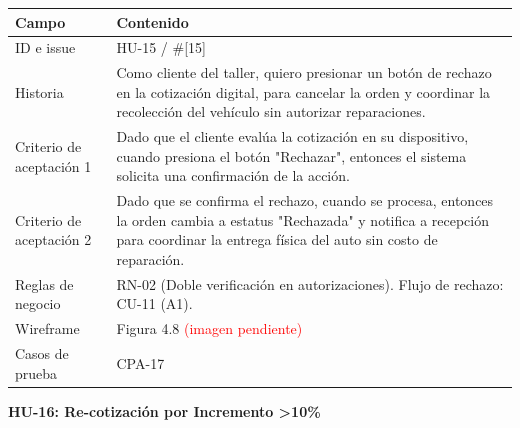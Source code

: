 {\def\LTcaptype{none} %
\begin{longtable}[]{@{}
  >{\raggedright\arraybackslash}p{}
  >{\raggedright\arraybackslash}p{}@{}}
\toprule\noalign{}
\begin{minipage}[b]{\linewidth}\raggedright
\textbf{Campo}
\end{minipage} & \begin{minipage}[b]{\linewidth}\raggedright
\textbf{Contenido}
\end{minipage} \\
\midrule\noalign{}
\endhead
\bottomrule\noalign{}
\endlastfoot
ID e issue & HU-15 / \#{[}15{]} \\
Historia & Como cliente del taller, quiero presionar un botón de rechazo
en la cotización digital, para cancelar la orden y coordinar la
recolección del vehículo sin autorizar reparaciones. \\
Criterio de aceptación 1 & Dado que el cliente evalúa la cotización en
su dispositivo, cuando presiona el botón "Rechazar", entonces el sistema
solicita una confirmación de la acción. \\
Criterio de aceptación 2 & Dado que se confirma el rechazo, cuando se
procesa, entonces la orden cambia a estatus "Rechazada" y notifica a
recepción para coordinar la entrega física del auto sin costo de
reparación. \\
Reglas de negocio & RN-02 (Doble verificación en autorizaciones). Flujo
de rechazo: CU-11 (A1). \\
Wireframe & Figura 4.8 \textcolor{red}{(imagen pendiente)} \\
Casos de prueba & CPA-17 \\
\end{longtable}
}

\textbf{HU-16: Re-cotización por Incremento \textgreater10\%}


